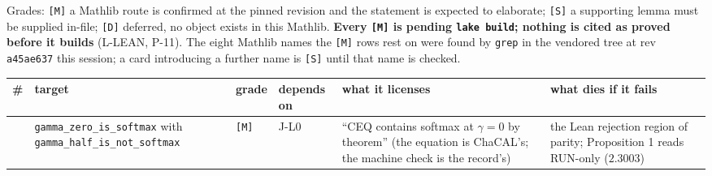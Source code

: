 \documentclass[11pt,a4paper]{article}
\newcounter{none}                 %
\theoremstyle{plain}
\theoremstyle{definition}
\theoremstyle{remark}
\begin{document}
Grades: \texttt{{[}M{]}} a Mathlib route is confirmed at the pinned
revision and the statement is expected to elaborate; \texttt{{[}S{]}} a
supporting lemma must be supplied in-file; \texttt{{[}D{]}} deferred, no
object exists in this Mathlib. \textbf{Every \texttt{{[}M{]}} is pending
\texttt{lake\ build}; nothing is cited as proved before it builds}
(L-LEAN, P-11). The eight Mathlib names the \texttt{{[}M{]}} rows rest
on were found by \texttt{grep} in the vendored tree at rev
\texttt{a45ae637} this session; a card introducing a further name is
\texttt{{[}S{]}} until that name is checked.

{\def\LTcaptype{none} %
\begin{longtable}[]{@{}
  >{\raggedright\arraybackslash}p{}
  >{\raggedright\arraybackslash}p{}
  >{\raggedright\arraybackslash}p{}
  >{\raggedright\arraybackslash}p{}
  >{\raggedright\arraybackslash}p{}
  >{\raggedright\arraybackslash}p{}@{}}
\toprule\noalign{}
\begin{minipage}[b]{\linewidth}\raggedright
\#
\end{minipage} & \begin{minipage}[b]{\linewidth}\raggedright
target
\end{minipage} & \begin{minipage}[b]{\linewidth}\raggedright
grade
\end{minipage} & \begin{minipage}[b]{\linewidth}\raggedright
depends on
\end{minipage} & \begin{minipage}[b]{\linewidth}\raggedright
what it licenses
\end{minipage} & \begin{minipage}[b]{\linewidth}\raggedright
what dies if it fails
\end{minipage} \\
\midrule\noalign{}
\endhead
\bottomrule\noalign{}
\endlastfoot
1 & \texttt{gamma\_zero\_is\_softmax} with
\texttt{gamma\_half\_is\_not\_softmax} & \texttt{{[}M{]}} & J-L0 & ``CEQ
contains softmax at \(\gamma=0\) by theorem'' (the equation is ChaCAL's;
the machine check is the record's) & the Lean rejection region of
parity; Proposition 1 reads RUN-only (\(2.3003\)) \\

\end{longtable}}
\end{document}
